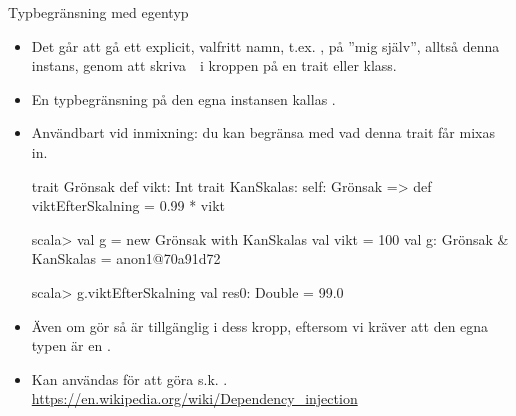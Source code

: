 \begin{Slide}{Typbegränsning med egentyp }\SlideFontSmall
\begin{itemize}\SlideFontTiny
  \item Det går att gå ett explicit, valfritt namn, t.ex. ,  på ''mig själv'', alltså denna instans, genom att skriva~~i kroppen på en trait eller klass. 
  \item En typbegränsning på den egna instansen kallas  . 
  \item Användbart vid inmixning: du kan begränsa med vad denna trait får mixas in.
\begin{Code}
trait Grönsak { def vikt: Int }
trait KanSkalas:
  self: Grönsak =>
  def viktEfterSkalning = 0.99 * vikt 
\end{Code}
\begin{REPLsmall}
scala> val g = new Grönsak with KanSkalas { val vikt = 100 }
val g: Grönsak & KanSkalas = anon1@70a91d72
                                                                                    
scala> g.viktEfterSkalning
val res0: Double = 99.0
\end{REPLsmall}
\item Även om   gör  så är   tillgänglig i dess kropp, eftersom vi kräver att den egna typen är en .
\item Kan användas för att göra s.k.  .\\\url{https://en.wikipedia.org/wiki/Dependency_injection}
\end{itemize}

\end{Slide}





